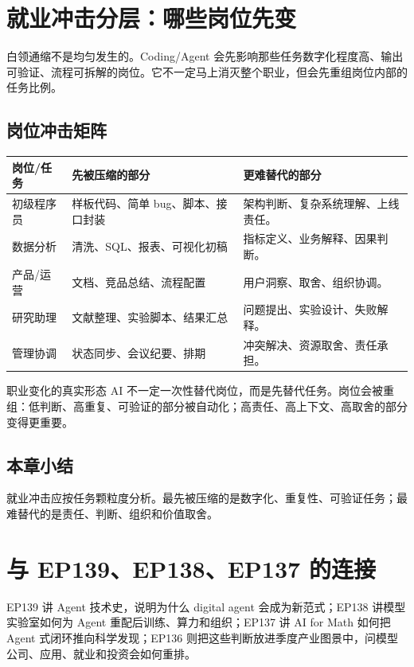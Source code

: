 \documentclass[a4paper]{article}
\begin{document}
\section{就业冲击分层：哪些岗位先变}

白领通缩不是均匀发生的。Coding/Agent 会先影响那些任务数字化程度高、输出可验证、流程可拆解的岗位。它不一定马上消灭整个职业，但会先重组岗位内部的任务比例。

\subsection{岗位冲击矩阵}

\noindent\begin{longtable}{p{}p{}p{}}
\toprule
岗位/任务 & 先被压缩的部分 & 更难替代的部分 \\
\midrule
初级程序员 & 样板代码、简单 bug、脚本、接口封装 & 架构判断、复杂系统理解、上线责任。 \\
数据分析 & 清洗、SQL、报表、可视化初稿 & 指标定义、业务解释、因果判断。 \\
产品/运营 & 文档、竞品总结、流程配置 & 用户洞察、取舍、组织协调。 \\
研究助理 & 文献整理、实验脚本、结果汇总 & 问题提出、实验设计、失败解释。 \\
管理协调 & 状态同步、会议纪要、排期 & 冲突解决、资源取舍、责任承担。 \\
\bottomrule
\end{longtable}

\begin{importantbox}{职业变化的真实形态}
AI 不一定一次性替代岗位，而是先替代任务。岗位会被重组：低判断、高重复、可验证的部分被自动化；高责任、高上下文、高取舍的部分变得更重要。
\end{importantbox}

\subsection{本章小结}

就业冲击应按任务颗粒度分析。最先被压缩的是数字化、重复性、可验证任务；最难替代的是责任、判断、组织和价值取舍。

\section{与 EP139、EP138、EP137 的连接}

EP139 讲 Agent 技术史，说明为什么 digital agent 会成为新范式；EP138 讲模型实验室如何为 Agent 重配后训练、算力和组织；EP137 讲 AI for Math 如何把 Agent 式闭环推向科学发现；EP136 则把这些判断放进季度产业图景中，问模型公司、应用、就业和投资会如何重排。
\end{document}

